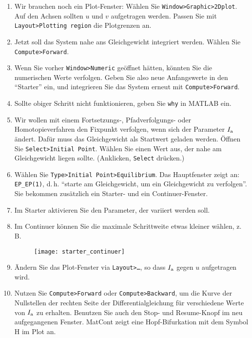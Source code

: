 \documentclass[11pt,a4paper]{article}
\begin{document}
\begin{aufg}
\begin{enumerate}
\item Wir brauchen noch ein Plot-Fenster: W\"ahlen Sie \texttt{Window>Graphic>2Dplot}.
Auf den Achsen sollten $u$ und $v$ aufgetragen werden. Passen Sie mit
\texttt{Layout>Plotting region} die Plotgrenzen an.

\item Jetzt soll das System nahe ans Gleichgewicht integriert werden. W\"ahlen
Sie \texttt{Compute>Forward}.

\item Wenn Sie vorher \texttt{Window>Numeric} geöffnet hätten, k\"onnten Sie die
numerischen Werte verfolgen. Geben Sie also neue Anfangswerte in den
``Starter'' ein, und integrieren Sie das System erneut mit \texttt{Compute>Forward}.

\item Sollte obiger Schritt nicht funktionieren, geben Sie \texttt{why}
in MATLAB ein.

\item Wir wollen mit einem Fortsetzungs-, Pfadverfolgungs- oder
Homotopieverfahren den Fixpunkt verfolgen, wenn
sich der Parameter $I_{\rm a}$ \"andert. Daf\"ur muss das Gleichgewicht als
Startwert geladen werden. \"Offnen Sie \texttt{Select>Initial Point}. W\"ahlen
Sie einen Wert aus, der nahe am Gleichgewicht liegen sollte. (Anklicken, \texttt{Select}
dr\"ucken.)

\item W\"ahlen Sie \texttt{Type>Initial Point>Equilibrium}. Das Hauptfenster
zeigt an: \texttt{EP\_EP(1)}, d.\,h. ``starte am Gleichgewicht, um ein
Gleichgewicht zu verfolgen''. Sie bekommen zus\"atzlich ein Starter- und ein
Continuer-Fenster.

\item Im Starter aktivieren Sie den Parameter, der variiert werden soll.

\item Im Continuer k\"onnen Sie die maximale Schrittweite etwas kleiner
w\"ahlen, z.\,B.
\begin{figure}[h!]
 \centering
 \texttt{[image: starter\_continuer]}
\end{figure}

\item \"Andern Sie das Plot-Fenster via \texttt{Layout>\dots}, so dass
$I_{\rm a}$ gegen $u$ aufgetragen wird.

\item Nutzen Sie \texttt{Compute>Forward} oder \texttt{Compute>Backward}, um
die Kurve der Nullstellen der rechten Seite der Differentialgleichung f\"ur
verschiedene Werte von $I_{\rm a}$ zu erhalten. Benutzen Sie auch den
Stop- und Resume-Knopf im neu aufgegangenen Fenster. MatCont zeigt eine Hopf-Bifurkation
mit dem Symbol H im Plot an.


\end{enumerate}
\end{aufg}
\end{document}
